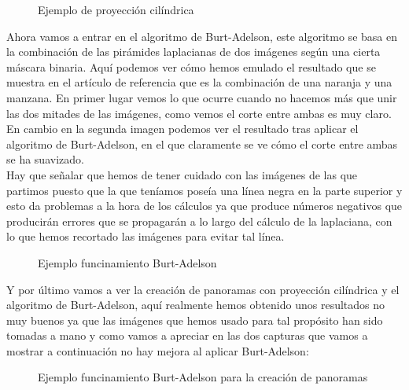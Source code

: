 \documentclass[10pt,a4paper]{article}
\theoremstyle{definition}
\begin{document}
\begin{figure}[H]
\centering
{}
\caption{Ejemplo de proyección cilíndrica} \label{proyecciones}
\end{figure}


Ahora vamos a entrar en el algoritmo de Burt-Adelson, este algoritmo se basa en la combinación de las pirámides laplacianas de dos imágenes según una cierta máscara binaria. Aquí podemos ver cómo hemos emulado el resultado que se muestra en el artículo de referencia que es la combinación de una naranja y una manzana. En primer lugar vemos lo que ocurre cuando no hacemos más que unir las dos mitades de las imágenes, como vemos el corte entre ambas es muy claro. En cambio en la segunda imagen podemos ver el resultado tras aplicar el algoritmo de Burt-Adelson, en el que claramente se ve cómo el corte entre ambas se ha suavizado.\\


Hay que señalar que hemos de tener cuidado con las imágenes de las que partimos puesto que la que teníamos poseía una línea negra en la parte superior y esto da problemas a la hora de los cálculos ya que produce números negativos que producirán errores que se propagarán a lo largo del cálculo de la laplaciana, con lo que hemos recortado las imágenes para evitar tal línea.\\

\begin{figure}[H]
\centering
{}
\caption{Ejemplo funcinamiento Burt-Adelson} \label{B-A}
\end{figure}

Y por último vamos a ver la creación de panoramas con proyección cilíndrica y el algoritmo de Burt-Adelson, aquí realmente hemos obtenido unos resultados no muy buenos ya que las imágenes que hemos usado para tal propósito han sido tomadas a mano y como vamos a apreciar en las dos capturas que vamos a mostrar a continuación no hay mejora al aplicar Burt-Adelson:

\begin{figure}[H]
\centering
{}
\caption{Ejemplo funcinamiento Burt-Adelson para la creación de panoramas} \label{B-A}
\end{figure}
\end{document}
